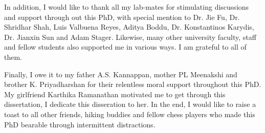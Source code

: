 In addition, I would like to thank all my lab-mates for stimulating discussions and support through out this PhD, with special mention to Dr. Jie Fu, Dr. Shridhar Shah, Luis Valbuena Reyes, Aditya Boddu, Dr. Konstantinos Karydis, Dr. Jianxin Sun and Adam Stager. Likewise, many other university faculty, staff and fellow students also supported me in various ways. I am grateful to all of them.

Finally, I owe it to my father A.S. Kannappan, mother PL Meenakshi and brother K. Priyadharshan for their relentless moral support throughout this PhD. My girlfriend Karthika Ramanathan motivated me to get through this dissertation, I dedicate this disseration to her. In the end, I would like to raise a toast to all other friends, hiking buddies and fellow chess players who made this PhD bearable through intermittent distractions.